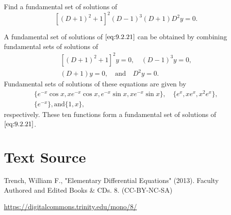 \documentclass{ximera}
\begin{document}
\begin{example}\label{example:9.2.8}
Find a fundamental set of solutions of
\begin{equation} \label{eq:9.2.21}
[(D+1)^2+1]^2(D-1)^3(D+1)D^2y=0.
\end{equation}


\begin{explanation} A fundamental set of solutions of $\eqref{eq:9.2.21}$ can be
obtained by combining fundamental sets of solutions of
$$
\begin{array}{c}
\left[(D+1)^2+1\right]^2 y=0,\quad (D-1)^3 y=0,\\
(D+1)y=0,\quad \mbox{and} \quad D^2y=0.
\end{array}
$$
Fundamental sets of solutions of these equations are given by
$$
\begin{array}{c}
\{e^{-x}\cos x, xe^{-x}\cos x, e^{-x}\sin x, xe^{-x}\sin
x\},\quad \{e^x, xe^x, x^2e^x\},\\
\{e^{-x}\},\mbox{and} \{1,x\},
\end{array}
$$
respectively. These ten functions form a fundamental set of solutions
of $\eqref{eq:9.2.21}$.
\end{explanation}
\end{example}


\section*{Text Source}
Trench, William F., "Elementary Differential Equations" (2013). Faculty Authored and Edited Books \& CDs. 8. (CC-BY-NC-SA)

\href{https://digitalcommons.trinity.edu/mono/8/}{https://digitalcommons.trinity.edu/mono/8/}
\end{document}
